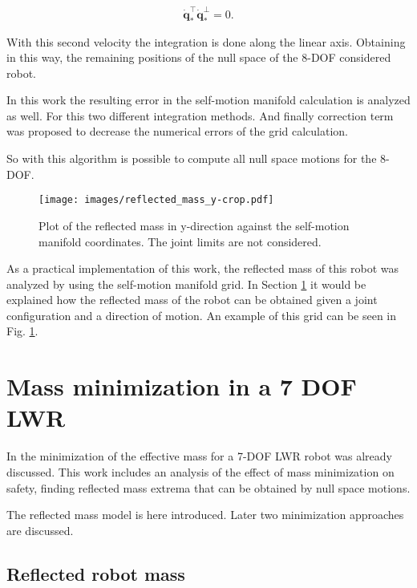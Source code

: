 \begin{equation}
\dot{\mathbf{q}}_*^\top\dot{\mathbf{q}}_*^{\bot}=0.
\label{eq:orthogonalVelocityVectors}
\end{equation}

With this second velocity the integration is done along the linear axis. Obtaining in this way, the remaining positions of the null space of the 8-DOF considered robot.



In this work the resulting error in the self-motion manifold calculation is analyzed as well. For this two different integration methods. And finally correction term was proposed to decrease the numerical errors of the grid calculation.  

So with this algorithm is possible to compute all null space motions for the 8-DOF. 


\begin{figure}[!htb]
	\centerline{
		\texttt{[image: images/reflected\_mass\_y-crop.pdf]}}
	\caption{Plot of the reflected mass in y-direction against the self-motion 		manifold coordinates. The joint limits are not considered.}
	\label{fig:reflected_mass_y-crop}
\end{figure}

As a practical implementation of this work, the reflected mass of this robot was analyzed by using the self-motion manifold grid. In Section \ref{sec:Nicostuff} it would be explained how the reflected mass of the robot can be obtained given a joint configuration and a direction of motion. 
An example of this grid can be seen in Fig.	\ref{fig:reflected_mass_y-crop}.




\section{Mass minimization in a 7 DOF LWR}
\label{sec:Nicostuff}



In \cite{paper_iros2017} the  minimization of the effective mass for a 7-DOF LWR robot was already discussed. This work includes an analysis of the effect of mass minimization on safety, finding reflected mass extrema that can be obtained by null space motions.

The reflected mass model is here introduced. Later two minimization approaches are discussed.

\subsection{Reflected robot mass}\label{sec:refl_mass_nico}



